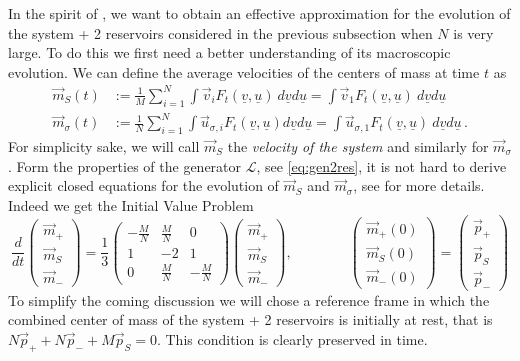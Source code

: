 \documentclass{article}
\newcommand*\cL{ \mathcal{L} }
\newcommand\uv{{\underline v}}
\newcommand\uu{{\underline u}}
\newcommand\vv{{\vec v}}
\newcommand\vu{{\vec u}}
\begin{document}
In the spirit of \cite{BLP25}, we want to obtain an effective approximation for the evolution of the system + 2
reservoirs considered in the previous subsection when $N$ is very large. To do this we first need a better understanding
of its macroscopic evolution. We can define the average velocities of the centers of mass at time $t$ as
\begin{equation*}
\begin{aligned}
\vec m_{S}(t) &:= \frac 1M\sum_{i=1}^N\int \vv_i F_t( \uv, \uu) \  d\uv d\uu =\int \vv_1 F_t( 
\uv, \uu) \  d\uv d\uu\\
\vec m_{\sigma}(t) &:= \frac 1N\sum_{i=1}^N\int \vu_{\sigma,i} F_t(\uv, \uu) d\uv d\uu = \int 
\vu_{\sigma,1} F_t(\uv, \uu) \  d\uv d\uu\,. 
\end{aligned}
\end{equation*}
For simplicity sake, we will call $\vec m_S$ the {\it velocity of the system} and similarly for $\vec m_\sigma$.  
Form the properties of the generator $\cL$, see \eqref{eq:gen2res}, it is not hard to derive explicit closed equations 
for the evolution of $\vec m_{S}$ and $\vec m_{\sigma}$, see \cite{BLP25} for more details. Indeed we get the Initial 
Value Problem
\begin{equation}\label{eq:IVPM1}
\frac{d}{dt}\begin{pmatrix}
		\vec m_+ \\ \vec m_S \\ \vec m_-
	\end{pmatrix}=
\frac 13\begin{pmatrix}
-\frac{M}{N} & \frac MN & 0\\
1 & -2 & 1\\
0 & \frac{M}{N} & -\frac MN
\end{pmatrix}
\begin{pmatrix}
		\vec m_+ \\ \vec m_S \\ \vec m_-
	\end{pmatrix},
\qquad\qquad
\begin{pmatrix}
		\vec m_+(0) \\ \vec m_S(0) \\ \vec m_-(0)
	\end{pmatrix}=
\begin{pmatrix}
		\vec p_+ \\ \vec p_S \\ \vec p_-
	\end{pmatrix}
\end{equation}
To simplify the coming discussion we will chose a reference frame in which the combined center of mass of the system + 2
reservoirs is initially at rest, that is $N\vec p_++N\vec p_-+M\vec p_S=0$. This condition is clearly preserved in time.
\end{document}
